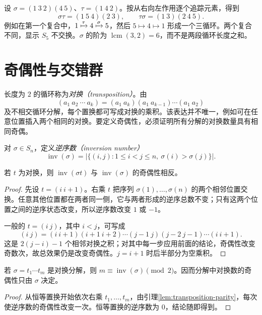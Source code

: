 \begin{example}[复合与元素阶]\label{ex:permutation-products}
设 $\sigma=(1\ 3\ 2)(4\ 5)$、$\tau=(1\ 4\ 2)$。按从右向左作用逐个追踪元素，得到
\[
  \sigma\tau=(1\ 5\ 4)(2\ 3),\qquad
  \tau\sigma=(1\ 3)(2\ 4\ 5).
\]
例如在第一个复合中，$1\xmapsto{\tau}4\xmapsto{\sigma}5$，然后 $5\mapsto4\mapsto1$ 形成一个三循环。两个复合不同，显示 $S_5$ 不交换。$\sigma$ 的阶为 $\operatorname{lcm}(3,2)=6$，而不是两段循环长度之和。
\end{example}

\section{奇偶性与交错群}\label{sec:permutation-sign}

长度为 $2$ 的循环称为\emph{对换（transposition）}。由
\begin{equation}\label{eq:cycle-transpositions}
  (a_1\ a_2\ \cdots\ a_k)
  =(a_1\ a_k)(a_1\ a_{k-1})\cdots(a_1\ a_2)
\end{equation}
及不相交循环分解，每个置换都可写成对换的乘积。该表达并不唯一，例如可在任意位置插入两个相同的对换。要定义奇偶性，必须证明所有分解的对换数量具有相同奇偶。

对 $\sigma\in S_n$，定义\emph{逆序数（inversion number）}
\[
  \operatorname{inv}(\sigma)
  =\bigl|\{(i,j):1\leq i<j\leq n,\ \sigma(i)>\sigma(j)\}\bigr|.
\]

\begin{lemma}[对换改变逆序数的奇偶性]\label{lem:transposition-parity}
若 $t$ 为对换，则 $\operatorname{inv}(\sigma t)$ 与 $\operatorname{inv}(\sigma)$ 的奇偶性相反。
\end{lemma}
\begin{proof}
先设 $t=(i\ i+1)$。右乘 $t$ 把序列 $\sigma(1),\ldots,\sigma(n)$ 的两个相邻位置交换。任意其他位置都在两者同一侧，它与两者形成的逆序总数不变；只有这两个位置之间的逆序状态改变，所以逆序数改变 $1$ 或 $-1$。

一般的 $t=(i\ j)$，其中 $i<j$，可写成
\[
  (i\ j)=(i\ i+1)(i+1\ i+2)\cdots(j-1\ j)
  (j-2\ j-1)\cdots(i\ i+1).
\]
这是 $2(j-i)-1$ 个相邻对换之积；对其中每一步应用前面的结论，奇偶性改变奇数次，故总效果仍是改变奇偶性。$j=i+1$ 时后半部分为空乘积。
\end{proof}

\begin{theorem}[置换奇偶性的良定义性]\label{thm:permutation-parity}
若 $\sigma=t_1\cdots t_m$ 是对换分解，则 $m\equiv\operatorname{inv}(\sigma)\pmod2$。因而分解中对换数的奇偶性只由 $\sigma$ 决定。
\end{theorem}
\begin{proof}
从恒等置换开始依次右乘 $t_1,\ldots,t_m$，由引理\ref{lem:transposition-parity}，每次使逆序数的奇偶性改变一次。恒等置换的逆序数为 $0$，结论随即得到。
\end{proof}

